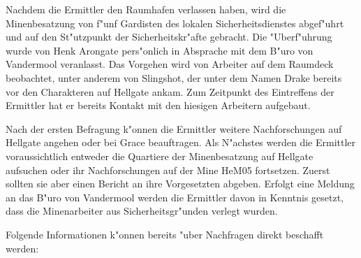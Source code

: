 Nachdem die Ermittler den Raumhafen verlassen haben, wird die Minenbesatzung von f"unf Gardisten des lokalen Sicherheitsdienstes abgef"uhrt und auf den St"utzpunkt der Sicherheitskr"afte gebracht. Die "Uberf"uhrung wurde von Henk Arongate pers"onlich in Absprache mit dem B"uro von Vandermool veranlasst. Das Vorgehen wird von Arbeiter auf dem Raumdeck beobachtet, unter anderem von Slingshot, der unter dem Namen Drake bereits vor den Charakteren auf Hellgate ankam. Zum Zeitpunkt des Eintreffens der Ermittler hat er bereits Kontakt mit den hiesigen Arbeitern aufgebaut. 

Nach der ersten Befragung k"onnen die Ermittler weitere Nachforschungen auf Hellgate angehen oder bei Grace beauftragen. Als N"achstes werden die Ermittler voraussichtlich entweder die Quartiere der Minenbesatzung auf Hellgate aufsuchen oder ihr Nachforschungen auf der Mine HeM05 fortsetzen. Zuerst sollten sie aber einen Bericht an ihre Vorgesetzten abgeben. Erfolgt eine Meldung an das B"uro von Vandermool werden die Ermittler davon in Kenntnis gesetzt, dass die Minenarbeiter aus Sicherheitsgr"unden verlegt wurden.

Folgende Informationen k"onnen bereits "uber Nachfragen direkt beschafft werden:


